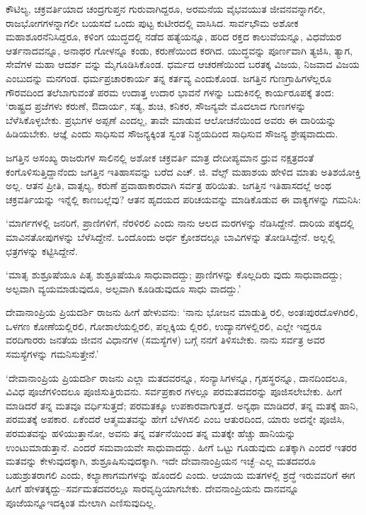 ಕೌಟಿಲ್ಯ, ಚಕ್ರವರ್ತಿಯಾದ ಚಂದ್ರಗುಪ್ತನ ಗುರುವಾಗಿದ್ದರೂ, ಅರಮನೆಯ ವೈಭವಯುತ ಜೀವನವನ್ನಾಗಲೀ, ರಾಜಭೋಗಗಳನ್ನಾಗಲೀ ಬಯಸದೆ ಒಂದು ಪುಟ್ಟ ಕುಟೀರದಲ್ಲಿ ವಾಸಿಸಿದ. ಸಾರ್ವಭೌಮ ಅಶೋಕ ಮಹಾಶೂರನೆನಿಸಿದ್ದರೂ, ಕಳಿಂಗ ಯುದ್ಧದಲ್ಲಿ ನಡೆದ ಹತ್ಯೆಯನ್ನೂ, ಹರಿದ ರಕ್ತದ ಕಾಲುವೆಯನ್ನೂ, ವಿಧವೆಯರ ಆರ್ತನಾದವನ್ನೂ, ಅನಾಥರ ಗೋಳನ್ನೂ ಕಂಡು, ಕರುಣೆಯಿಂದ ಕರಗಿದ. ಯುದ್ಧವನ್ನು ಪೂರ್ಣವಾಗಿ ತ್ಯಜಿಸಿ, ತ್ಯಾಗ, ಸೇವೆಗಳ ಮಹಾ ಆದರ್ಶ ವನ್ನು ಮೈಗೂಡಿಸಿಕೊಂಡ. ಧರ್ಮದ ಆಚರಣೆಯಿಂದ ಬರತಕ್ಕ ವಿಜಯ, ನಿಜವಾದ ವಿಜಯ ಎಂಬುದನ್ನು ಮನಗಂಡ. ಧರ್ಮಪ್ರಚಾರಕಾರ್ಯ ತನ್ನ ಕರ್ತವ್ಯ ಎಂದುಕೊಂಡ. ಜಗತ್ತಿನ ಗುಣಗ್ರಾಹಿಗಳೆಲ್ಲರೂ ಗೌರವದಿಂದ ತಲೆಬಾಗುವಂತೆ ಪರಮ ಉದಾತ್ತ ಉದಾರ ಭಾವನೆ ಗಳನ್ನು ಬದುಕಿನಲ್ಲಿ ಕಾರ್ಯರೂಪಕ್ಕೆ ತಂದ: ‘ರಾಷ್ಟ್ರದ ಪ್ರಜೆಗಳು ಕರುಣೆ, ಔದಾರ್ಯ, ಸತ್ಯ, ಶುಚಿ, ಕನಿಕರ, ಸೌಜನ್ಯವೇ ಮೊದಲಾದ ಗುಣಗಳನ್ನು ಬೆಳೆಸಿಕೊಳ್ಳಬೇಕು. ಪ್ರಭುಗಳ ಅಪ್ಪಣೆ ಎಂದಲ್ಲ, ತಾವೇ ಮಾಡುವ ಆಲೋಚನೆಯಿಂದ ಅವರು ಈ ದಾರಿಯನ್ನು ಹಿಡಿಯಬೇಕು. ಆಜ್ಞೆ ಎಂದು ಸಾಧಿಸುವ ಸೌಜನ್ಯಕ್ಕಿಂತ ಸ್ವಂತ ನಿಶ್ಚಯದಿಂದ ಸಾಧಿಸುವ ಸೌಜನ್ಯ ಶ್ರೇಷ್ಠವಾದುದು.

ಜಗತ್ತಿನ ಅಸಂಖ್ಯ ರಾಜರುಗಳ ಸಾಲಿನಲ್ಲಿ ಅಶೋಕ ಚಕ್ರವರ್ತಿ ಮಾತ್ರ ದೇದೀಪ್ಯಮಾನ ಧ್ರುವ ನಕ್ಷತ್ರದಂತೆ ಕಂಗೊಳಿಸುತ್ತಿದ್ದಾನೆಂದು ಜಗತ್ತಿನ ಇತಿಹಾಸವನ್ನು ಬರೆದ ಎಚ್. ಜಿ. ವೆಲ್ಸ್ ಮಹಾಶಯ ಹೇಳಿದ ಮಾತು ಅತಿಶಯೋಕ್ತಿ ಅಲ್ಲ. ಆತನ ಪ್ರೀತಿ, ವಾತ್ಸಲ್ಯ, ಕರುಣೆ ಪ್ರವಾಹಾಕಾರವಾಗಿ ಸರ್ವತ್ರ ಹರಿಯಿತು. ಜಗತ್ತಿನ ಇತಿಹಾಸದಲ್ಲೆ ಅಂಥ ಚಕ್ರವರ್ತಿಯನ್ನು ಇನ್ನೆಲ್ಲಿ ಕಾಣಬಲ್ಲೆವು? ಆತನ ಹೃದಯದ ಪರಿಚಯವನ್ನು ಮಾಡಿಕೊಡುವ ಈ ವಾಕ್ಯಗಳನ್ನು ಗಮನಿಸಿ:

‘ಮಾರ್ಗಗಳಲ್ಲಿ ಜನರಿಗೆ, ಪ್ರಾಣಿಗಳಿಗೆ, ನೆರಳಿರಲಿ ಎಂದು ನಾನು ಆಲದ ಮರಗಳನ್ನು ನೆಡಿಸಿದ್ದೇನೆ. ದಾರಿಯ ಪಕ್ಕದಲ್ಲಿ ಮಾವಿನತೋಪುಗಳನ್ನು ಬೆಳೆಸಿದ್ದೇನೆ. ಒಂದೊಂದು ಅರ್ಧ ಕ್ರೋಶದಲ್ಲೂ ಬಾವಿಗಳನ್ನು ತೋಡಿಸಿದ್ದೇನೆ. ಅಲ್ಲಲ್ಲಿ ಛತ್ರಗಳನ್ನು ಕಟ್ಟಿಸಿದ್ದೇನೆ.

‘ಮಾತೃ ಶುಶ್ರೂಷೆಯೂ ಪಿತೃ ಶುಶ್ರೂಷೆಯೂ ಸಾಧುವಾದದ್ದು; ಪ್ರಾಣಿಗಳನ್ನು ಕೊಲ್ಲದಿರು ವುದು ಸಾಧುವಾದದ್ದು; ಅಲ್ಪವಾಗಿ ವ್ಯಯಮಾಡುವುದೂ, ಅಲ್ಪವಾಗಿ ಕೂಡಿಡುವುದೂ ಸಾಧು ವಾದದ್ದು.’

ದೇವಾನಾಂಪ್ರಿಯ ಪ್ರಿಯದರ್ಶಿ ರಾಜನು ಹೀಗೆ ಹೇಳುವನು: ‘ನಾನು ಭೋಜನ ಮಾಡುತ್ತಿ ರಲಿ, ಅಂತಃಪುರದೊಳಗಿರಲಿ, ಒಳಗಣ ಕೋಣೆಯಲ್ಲಿರಲಿ, ಗೋಶಾಲೆಯಲ್ಲಿರಲಿ, ಪಲ್ಲಕ್ಕಿಯ ಲ್ಲಿರಲಿ, ಉದ್ಯಾನಗಳಲ್ಲಿರಲಿ, ಎಲ್ಲೇ ಇದ್ದರೂ ವರದಿಗಾರರು ಜನತೆಯ ಜೀವನ ವಿಧಾನಗಳ (ಸಮಸ್ಯೆಗಳ) ಬಗ್ಗೆ ನನಗೆ ತಿಳಿಸಬೇಕು. ನಾನು ಸರ್ವತ್ರ ಅವರ ಸಮಸ್ಯೆಗಳನ್ನು ಗಮನಿಸುತ್ತೇನೆ.’

‘ದೇವಾನಾಂಪ್ರಿಯ ಪ್ರಿಯದರ್ಶಿ ರಾಜನು ಎಲ್ಲಾ ಮತದವರನ್ನೂ, ಸಂನ್ಯಾಸಿಗಳನ್ನೂ, ಗೃಹಸ್ಥರನ್ನೂ, ದಾನದಿಂದಲೂ, ವಿವಿಧ ಪೂಜೆಗಳಿಂದಲೂ ಪೂಜಿಸುತ್ತಿರುವನು. ಸರ್ವಪ್ರಕಾರ ಗಳಲ್ಲೂ ಪರಮತದವರನ್ನು ಪೂಜಿಸಲೇಬೇಕು. ಹೀಗೆ ಮಾಡಿದರೆ ತನ್ನ ಮತವೂ ವರ್ಧಿಸುತ್ತದೆ; ಪರಮತಕ್ಕೂ ಉಪಕಾರವಾಗುತ್ತದೆ. ಅನ್ಯಥಾ ಮಾಡಿದರೆ, ತನ್ನ ಮತಕ್ಕೆ ಹಾನಿ, ಪರಮತಕ್ಕೆ ಅಪಕಾರ. ಏಕೆಂದರೆ ಆತ್ಮಮತವನ್ನು ಹೇಗೆ ಬೆಳಗಿಸಲಿ ಎಂಬ ಆತುರದಿಂದ, ಯಾರು ಅದನ್ನೇ ಪೂಜಿಸಿ, ಪರಮತವನ್ನು ಹಳಿಯುತ್ತಾನೋ, ಅವನು ತನ್ನ ವರ್ತನೆಯಿಂದ ತನ್ನ ಮತಕ್ಕೇ ಹೆಚ್ಚು ಹಾನಿಯನ್ನು ಉಂಟುಮಾಡುತ್ತಾನೆ. ಎಂದರೆ ಸಮವಾಯವೇ ಸಾಧುವಾದದ್ದು. ಹೀಗೆ ಒಟ್ಟು ಗೂಡುವುದು ಏತಕ್ಕಾಗಿ ಎಂದರೆ ಇತರರ ಮತವನ್ನು ಕೇಳುವುದಕ್ಕಾಗಿ, ಶುಶ್ರೂಷಿಸುವುದಕ್ಕಾಗಿ. ಇದೇ ದೇವಾನಾಂಪ್ರಿಯನ ಇಚ್ಛೆ–ಎಲ್ಲ ಮತದವರೂ ಬಹುಶ್ರುತರಾಗಲಿ ಎಂದು, ಕಲ್ಯಾಣಾಗಮಗಳನ್ನು ಹೊಂದಲಿ ಎಂದು. ಆಯಾಯ ಮತಗಳಲ್ಲಿ ಶ್ರದ್ಧೆ ಇರುವವರಿಗೆ ಈಗ ಹೀಗೆ ಹೇಳತಕ್ಕದ್ದು–ಸರ್ವಮತದವರಲ್ಲೂ ಸಾರವೃದ್ಧಿಯಾಗಬೇಕು. ದೇವನಾಂಪ್ರಿಯನು ದಾನವನ್ನೂ ಪೂಜೆಯನ್ನೂಇದಕ್ಕಿಂತ ಮೇಲಾಗಿ ಎಣಿಸುವುದಿಲ್ಲ.

